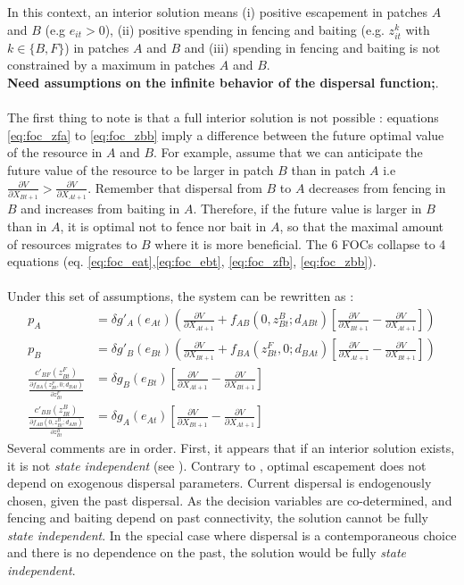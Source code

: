 \documentclass{article}
\begin{document}
In this context, an interior solution means (i) positive escapement in patches $A$ and $B$ (e.g $e_{it}>0$), (ii) positive spending in fencing and baiting (e.g. $z_{it}^k$ with $k \in \{B, F\}$) in patches $A$ and $B$ and (iii) spending in fencing and baiting is not constrained by a maximum in patches $A$ and $B$. \\
\textbf{Need assumptions on the infinite behavior of the dispersal function;}. 
\\\\
The first thing to note is that a full interior solution is not possible : equations \ref{eq:foc_zfa} to \ref{eq:foc_zbb} imply a difference between the future optimal value of the resource in $A$ and $B$. For example, assume that we can anticipate the future value of the resource to be larger in patch $B$ than in patch $A$ i.e $\frac{\partial V}{\partial X_{Bt+1}}> \frac{\partial V}{\partial X_{At+1}}$. Remember that dispersal from $B$ to $A$ decreases from fencing in $B$ and increases from baiting in $A$. Therefore, if the future value is larger in $B$ than in $A$, it is optimal not to fence nor bait in $A$, so that the maximal amount of resources migrates to $B$ where it is more beneficial. The 6 FOCs collapse to 4 equations (eq. \ref{eq:foc_eat},\ref{eq:foc_ebt}, \ref{eq:foc_zfb}, \ref{eq:foc_zbb}).
\\\\
Under this set of assumptions, the system can be rewritten as : 
\begin{align}
p_A &= \delta g'_A(e_{At}) \left(\frac{\partial V}{\partial X_{At+1}} + f_{AB}(0, z_{Bt}^B; d_{ABt})\left[\frac{\partial V}{\partial X_{Bt+1}} - \frac{\partial V}{\partial X_{At+1}}  \right] \right)\\
%
p_B &= \delta g'_B(e_{Bt}) \left(\frac{\partial V}{\partial X_{Bt+1}} + f_{BA}(z_{Bt}^F, 0; d_{BAt})\left[\frac{\partial V}{\partial X_{At+1}} - \frac{\partial V}{\partial X_{Bt+1}}  \right] \right)\\
%
\frac{c'_{BF}(z_{Bt}^F)}{\frac{\partial f_{BA}(z_{Bt}^F, 0; d_{BAt})}{\partial z_{Bt}^F}} &= \delta g_B(e_{Bt})\left[ \frac{\partial V}{\partial X_{At+1}} - \frac{\partial V}{\partial X_{Bt+1}} \right]\\
%
\frac{c'_{BB}(z_{Bt}^B)}{\frac{\partial f_{AB}(0, z_{Bt}^B; d_{ABt})}{\partial z_{Bt}^B}} &= \delta g_A(e_{At})\left[ \frac{\partial V}{\partial X_{Bt+1}} - \frac{\partial V}{\partial X_{At+1}} \right]
\end{align}
Several comments are in order. First, it appears that if an interior solution exists, it is not \textit{state independent} (see \cite{costello_optimal_2008}). Contrary to \cite{costello_optimal_2008}, optimal escapement does not depend on exogenous dispersal parameters. Current dispersal is endogenously chosen, given the past dispersal. As the decision variables are co-determined, and fencing and baiting depend on past connectivity, the solution cannot be fully \textit{ state independent}. In the special case where dispersal is a contemporaneous choice and there is no dependence on the past, the solution would be fully \textit{state independent}.
\end{document}
